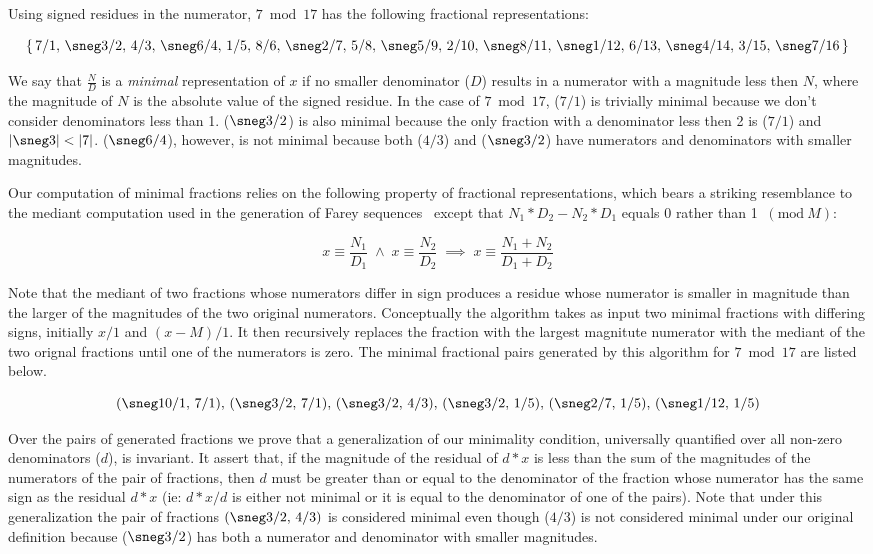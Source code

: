 \documentclass[submission,copyright,creativecommons]{eptcs}
\newcommand{\Mod}[1]{\ (\mathrm{mod}\ #1)}
\begin{document}
Using signed residues in the numerator, $7 \bmod 17$ has the
following fractional representations:

\[
\{
\,7/1,\,\sneg3/2,\,4/3,\,\sneg6/4,\,1/5,\,8/6,\,\sneg2/7,\,5/8,\,\sneg5/9,\,2/10,\,\sneg8/11,\,\sneg1/12,\,6/13,\,\sneg4/14,\,3/15,\,\sneg7/16\,
\}
\]

We say that $\frac{N}{D}$ is a \emph{minimal} representation of $x$ if
no smaller denominator ($D$) results in a numerator with a magnitude
less then $N$, where the magnitude of $N$ is the absolute value
of the signed residue.
In the case of $7 \bmod 17$, ($7/1$) is trivially minimal because we
don't consider denominators less than 1.  ($\sneg3/2$) is also minimal because
the only fraction with a denominator less then 2 is ($7/1$) and 
$\lvert \sneg3 \rvert < \lvert 7\rvert$. 
($\sneg6/4$), however, is not minimal because both ($4/3$)
and ($\sneg3/2$) have numerators and denominators with smaller magnitudes.

Our computation of minimal fractions relies on the following property
of fractional representations, which bears a striking resemblance to
the mediant computation used in the generation of Farey sequences~\cite{Farey}
except that $N_1*D_2 - N_2*D_1$ equals 0 rather than 1 $\Mod{M}$:

\begin{equation*}
x \equiv \frac{N_1}{D_1} \; \land \;
x \equiv \frac{N_2}{D_2} \; \implies \;
x \equiv \frac{N_1 + N_2}{D_1 + D_2}
\end{equation*}

Note that the mediant of two fractions whose numerators differ in sign
produces a residue whose numerator is smaller in magnitude than the
larger of the magnitudes of the two original numerators.  Conceptually
the algorithm takes as input two minimal fractions with differing
signs, initially $x/1$ and $(x-M)/1$.  It then recursively replaces
the fraction with the largest magnitute numerator with the mediant of
the two orignal fractions until one of the numerators is zero.  The
minimal fractional pairs generated by this algorithm for $7 \bmod 17$
are listed below.

\[
(\sneg10/1,\,7/1),\,(\sneg3/2,\,7/1),\,(\sneg3/2,\,4/3),\,(\sneg3/2,\,1/5),\,(\sneg2/7,\,1/5),\,(\sneg1/12,\,1/5)
\]

Over the pairs of generated fractions we prove that a generalization
of our minimality condition, universally quantified over all non-zero
denominators ($d$), is invariant.  It assert that, if the magnitude of
the residual of $d*x$ is less than the sum of the magnitudes of the
numerators of the pair of fractions, then $d$ must be greater than or
equal to the denominator of the fraction whose numerator has the same
sign as the residual $d*x$ (ie: $d*x/d$ is either not minimal or it is
equal to the denominator of one of the pairs).  Note that under this
generalization the pair of fractions $(\sneg3/2,\,4/3)$ is considered
minimal even though ($4/3$) is not considered minimal under our original
definition because ($\sneg3/2$) has both a numerator and denominator
with smaller magnitudes.
\end{document}
